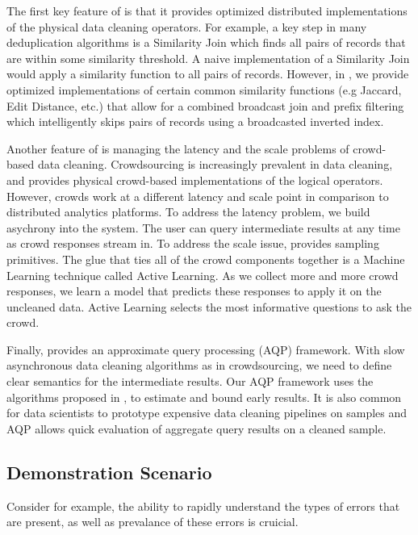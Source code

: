 The first key feature of \projx is that it provides optimized distributed implementations 
of the physical data cleaning operators.
For example, a key step in many deduplication algorithms is a Similarity Join which finds all pairs of records that are within some similarity threshold.
A naive implementation of a Similarity Join would apply a similarity function to all pairs of records.
However, in \projx, we provide optimized implementations of certain common similarity functions (e.g Jaccard, Edit Distance, etc.) that allow for 
a combined broadcast join and prefix filtering which intelligently skips pairs of records using a broadcasted inverted index.

Another feature of \projx is managing the latency and the scale problems of crowd-based data cleaning. 
Crowdsourcing is increasingly prevalent in data cleaning, and \projx provides physical crowd-based implementations
of the logical operators.
However, crowds work at a different latency and scale point in comparison to distributed analytics platforms.
To address the latency problem, we build asychrony into the system.
The user can query intermediate results at any time as crowd responses stream in.
To address the scale issue, \projx provides sampling primitives.
The glue that ties all of the crowd components together is a Machine Learning technique called Active Learning.
As we collect more and more crowd responses, we learn a model that predicts these responses to apply it on the uncleaned data.
Active Learning selects the most informative questions to ask the crowd.

Finally, \projx provides an approximate query processing (AQP) framework.
With slow asynchronous data cleaning algorithms as in crowdsourcing, we need 
to define clear semantics for the intermediate results.
Our AQP framework uses the algorithms proposed in \cite{wang1999sample}, to estimate and bound early results.
It is also common for data scientists to prototype expensive data cleaning pipelines on samples and AQP allows quick evaluation of
aggregate query results on a cleaned sample.

\subsection{Demonstration Scenario}

\fi




Consider for example, the ability to rapidly understand the types of errors that are present, as well as prevalance of 
these errors is cruicial.



